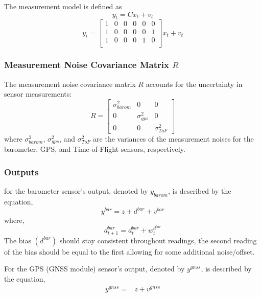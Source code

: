 \documentclass{article}
\begin{document}
    The measurement model is defined as
    \begin{equation}
    y_t = C x_t + v_t
    \end{equation}
    \begin{equation}
        y_t  = 
        \begin{bmatrix}
            1 & 0 & 0 & 0 & 0 & 0 \\
            1 & 0 & 0 & 0 & 0 & 1 \\
            1 & 0 & 0 & 0 & 1 & 0 \\
        \end{bmatrix}
            x_t + v_t
    \end{equation}
    \subsubsection*{Measurement Noise Covariance Matrix \( R \)}
    The measurement noise covariance matrix \( R \) accounts for the uncertainty
    in sensor measurements:
    \begin{equation}
    R = 
    \begin{bmatrix}
    \sigma_{barom}^2 & 0 & 0 \\
    0 & \sigma_{gps}^2 & 0 \\
    0 & 0 & \sigma_{ToF}^2
    \end{bmatrix}
    \end{equation}
    where \( \sigma_{barom}^2 \), \( \sigma_{gps}^2 \), and \( \sigma_{ToF}^2 \)
    are the variances of the measurement noises for the barometer, GPS, and
    Time-of-Flight sensors, respectively.

    \subsubsection*{Outputs}
    for the barometer sensor's output, denoted by \( y_{barom} \), is described
    by the equation,
    \begin{equation}
    y^{bar} = z + d^{bar} + v^{bar}
    \end{equation}
    where, 
    \begin{equation}
        d^{bar}_{t+1} = d^{bar}_t + w_{t}^{d^{bar}}
    \end{equation}
    The bias $(d^{bar})$ should stay consistent throughout readings, the second
    reading of the bias should be equal to the first allowing for some
    additional noise/offset.

    For the GPS (GNSS module) sensor's output, denoted by \( y^{gnss} \), is
    described by the equation,
    \begin{subequations}
        \begin{align}
            y^{gnss} 
            {}={}&
            z + v^{gnss} 
        \end{align}
    \end{subequations}
\end{document}
